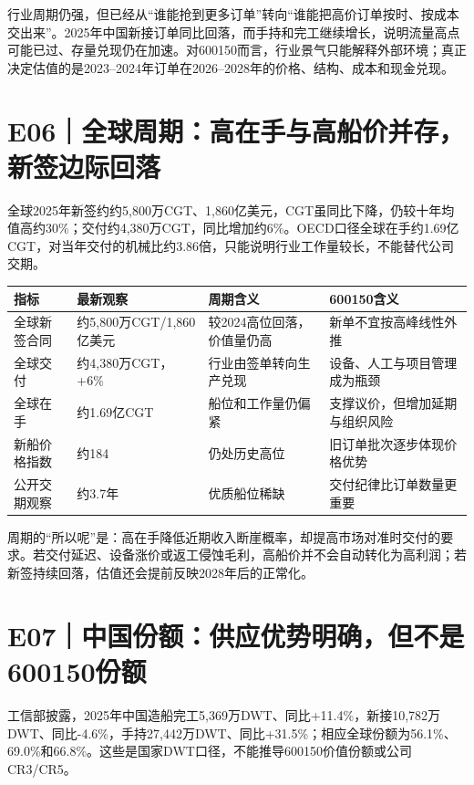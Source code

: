 行业周期仍强，但已经从“谁能抢到更多订单”转向“谁能把高价订单按时、按成本交出来”。2025年中国新接订单同比回落，而手持和完工继续增长，说明流量高点可能已过、存量兑现仍在加速。对600150而言，行业景气只能解释外部环境；真正决定估值的是2023--2024年订单在2026--2028年的价格、结构、成本和现金兑现。

\section{E06｜全球周期：高在手与高船价并存，新签边际回落}

全球2025年新签约约5,800万CGT、1,860亿美元，CGT虽同比下降，仍较十年均值高约30\%；交付约4,380万CGT，同比增加约6\%。OECD口径全球在手约1.69亿CGT，对当年交付的机械比约3.86倍，只能说明行业工作量较长，不能替代公司交期。

\begin{exhibitbox}[全球造船周期仪表盘]
\small
\begin{tabularx}{\exhibitboxwidth}{L{3.0cm}R{3.0cm}L{4.2cm}X}
\toprule
\textbf{指标} & \textbf{最新观察} & \textbf{周期含义} & \textbf{600150含义} \\
\midrule
全球新签合同 & 约5,800万CGT/1,860亿美元 & 较2024高位回落，价值量仍高 & 新单不宜按高峰线性外推 \\
全球交付 & 约4,380万CGT，+6\% & 行业由签单转向生产兑现 & 设备、人工与项目管理成为瓶颈 \\
全球在手 & 约1.69亿CGT & 船位和工作量仍偏紧 & 支撑议价，但增加延期与组织风险 \\
新船价格指数 & 约184 & 仍处历史高位 & 旧订单批次逐步体现价格优势 \\
公开交期观察 & 约3.7年 & 优质船位稀缺 & 交付纪律比订单数量更重要 \\
\bottomrule
\end{tabularx}
\end{exhibitbox}

周期的“所以呢”是：高在手降低近期收入断崖概率，却提高市场对准时交付的要求。若交付延迟、设备涨价或返工侵蚀毛利，高船价并不会自动转化为高利润；若新签持续回落，估值还会提前反映2028年后的正常化。

\section{E07｜中国份额：供应优势明确，但不是600150份额}

工信部披露，2025年中国造船完工5,369万DWT、同比+11.4\%，新接10,782万DWT、同比-4.6\%，手持27,442万DWT、同比+31.5\%；相应全球份额为56.1\%、69.0\%和66.8\%。这些是国家DWT口径，不能推导600150价值份额或公司CR3/CR5。

